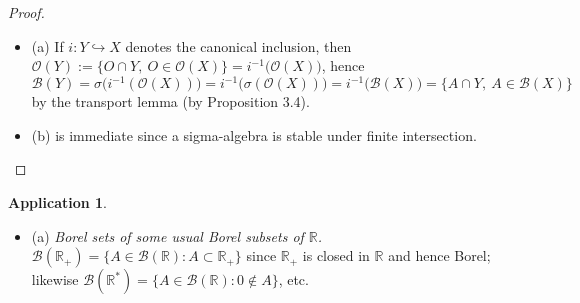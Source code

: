 \documentclass[12pt]{article}
\theoremstyle{definition}
\newtheorem{application}{Application}[section]
\begin{document}
\begin{proof}
\begin{itemize}
\item (a) If $i:Y\hookrightarrow X$ denotes the canonical inclusion, then $\mathcal O(Y):=\{O\cap Y,\ O\in\mathcal O(X)\}=i^{-1}\bigl(\mathcal O(X)\bigr)$, hence
\[
\mathcal B(Y)=\sigma\bigl(i^{-1}(\mathcal O(X))\bigr)=i^{-1}\bigl(\sigma(\mathcal O(X))\bigr)=i^{-1}\bigl(\mathcal B(X)\bigr)=\{A\cap Y,\ A\in\mathcal B(X)\}
\]
by the transport lemma (by Proposition 3.4).
\quad

\item (b) is immediate since a sigma-algebra is stable under finite intersection.
\end{itemize}
\end{proof}

\begin{application}
\begin{itemize}
\item (a) \emph{Borel sets of some usual Borel subsets of $\mathbb R$.}
$\mathcal B(\mathbb R_+)=\{A\in\mathcal B(\mathbb R): A\subset \mathbb R_+\}$ since $\mathbb R_+$ is closed in $\mathbb R$ and hence Borel; likewise $\mathcal B(\mathbb R^\ast)=\{A\in\mathcal B(\mathbb R): 0\notin A\}$, etc.


\end{itemize}
\end{application}
\end{document}
